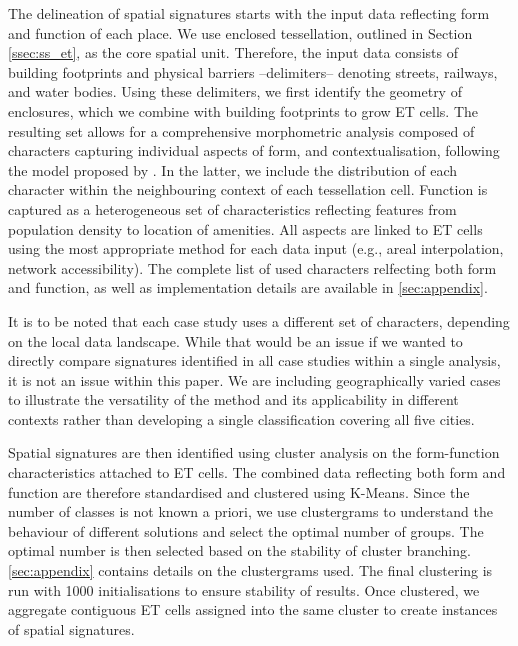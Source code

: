

The delineation of spatial signatures starts with the input data reflecting form and
function of each place. We use enclosed tessellation, outlined in Section
\ref{ssec:ss_et}, as the core spatial unit. Therefore, the input
data consists of building footprints and physical barriers --delimiters-- denoting streets,
railways, and water bodies.
Using these delimiters, we first identify the geometry of enclosures, which we
combine with building footprints to grow ET cells.
The resulting set allows for a comprehensive morphometric analysis
composed of characters capturing individual aspects of form, and
contextualisation, following the model proposed by
\citealp{fleischmann2021methodological}. In the latter, we
include the distribution of each character within the neighbouring context of each
tessellation cell.
Function is captured as a heterogeneous set of characteristics reflecting
features from
population density to location of amenities. All aspects are linked to ET cells
using the most appropriate method for each data input (e.g., areal
        interpolation,
network accessibility). The complete list of used characters relfecting both form and
function, as well as implementation details are available in \ref{sec:appendix}.

It is to be noted that each case study uses a different set of characters, depending on
the local data landscape. While that would be an issue if we wanted to directly compare
signatures identified in all case studies within a single analysis, it is not an issue
within this paper. We are including geographically varied cases to illustrate the
versatility of the method and its applicability in different contexts rather than
developing a single classification covering all five cities.


Spatial signatures are then identified using cluster analysis on the
form-function characteristics attached to ET cells.
The combined data reflecting both form and function are therefore standardised and
clustered using K-Means. Since the number of classes is not known a priori,
we use clustergrams \citep{schonlau2002clustergram} to understand the
behaviour of different solutions and select the optimal number of groups.
The optimal number is then selected based on the stability of cluster branching.
\ref{sec:appendix} contains details on the clustergrams used.
The final clustering is run with 1000 initialisations to ensure stability of
results.
Once clustered, we
aggregate contiguous ET cells assigned into the same cluster to
create instances of spatial signatures.


